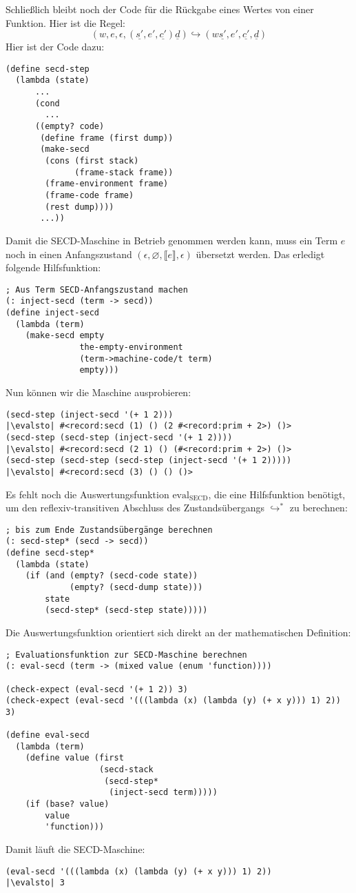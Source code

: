 %
Schließlich bleibt noch der Code für die Rückgabe eines Wertes von
einer Funktion.  Hier ist die Regel:
%
\begin{displaymath}
  (w, e, \epsilon, (\underline{s'}, e', \underline{c'}) \underline{d})
  \hookrightarrow
  (w\underline{s'}, e', \underline{c'}, \underline{d})
\end{displaymath}
%
Hier ist der Code dazu:
%
\begin{lstlisting}
(define secd-step
  (lambda (state)
      ...
      (cond
        ...
      ((empty? code)
       (define frame (first dump))
       (make-secd
        (cons (first stack)
              (frame-stack frame))
        (frame-environment frame)
        (frame-code frame)
        (rest dump))))
       ...))
\end{lstlisting}
%
Damit die SECD-Maschine in Betrieb genommen werden kann, muss ein Term
$e$ noch in einen Anfangszustand $(\epsilon, \varnothing, \llbracket
e\rrbracket, \epsilon)$ übersetzt werden.  Das erledigt folgende
Hilfsfunktion:
%
\begin{lstlisting}
; Aus Term SECD-Anfangszustand machen
(: inject-secd (term -> secd))
(define inject-secd
  (lambda (term)
    (make-secd empty
               the-empty-environment
               (term->machine-code/t term)
               empty)))
\end{lstlisting}
%
Nun können wir die Maschine ausprobieren:
%
\begin{lstlisting}
(secd-step (inject-secd '(+ 1 2)))
|\evalsto| #<record:secd (1) () (2 #<record:prim + 2>) ()>
(secd-step (secd-step (inject-secd '(+ 1 2))))
|\evalsto| #<record:secd (2 1) () (#<record:prim + 2>) ()>
(secd-step (secd-step (secd-step (inject-secd '(+ 1 2)))))
|\evalsto| #<record:secd (3) () () ()>
\end{lstlisting}
%
Es fehlt noch die Auswertungsfunktion $\mathrm{eval}_\mathrm{SECD}$,
die eine Hilfsfunktion benötigt, um den reflexiv-transitiven Abschluss des
Zustandsübergangs $\hookrightarrow^*$ zu berechnen:
%
\begin{lstlisting}
; bis zum Ende Zustandsübergänge berechnen
(: secd-step* (secd -> secd))
(define secd-step*
  (lambda (state)
    (if (and (empty? (secd-code state))
             (empty? (secd-dump state)))
        state
        (secd-step* (secd-step state)))))
\end{lstlisting}
%
Die Auswertungsfunktion orientiert sich direkt an der mathematischen
Definition:
%
\begin{lstlisting}
; Evaluationsfunktion zur SECD-Maschine berechnen
(: eval-secd (term -> (mixed value (enum 'function))))

(check-expect (eval-secd '(+ 1 2)) 3)
(check-expect (eval-secd '(((lambda (x) (lambda (y) (+ x y))) 1) 2)) 3)

(define eval-secd
  (lambda (term)
    (define value (first
                   (secd-stack
                    (secd-step* 
                     (inject-secd term)))))
    (if (base? value)
        value
        'function)))
\end{lstlisting}
%
Damit läuft die SECD-Maschine:
%
\begin{lstlisting}
(eval-secd '(((lambda (x) (lambda (y) (+ x y))) 1) 2))
|\evalsto| 3
\end{lstlisting}

